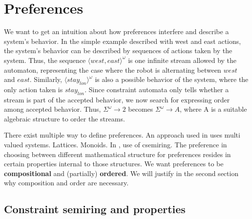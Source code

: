 \section{Preferences}


We want to get an intuition about how preferences interfere and describe a system's behavior. In the simple example described with west and east actions, the system's behavior can be described by sequences of actions taken by the system. Thus, the sequence $\langle west, east \rangle ^{\omega}$ is one infinite stream allowed by the automaton, representing the case where the robot is alternating between $west$ and $east$. Similarly, $\langle stay_{lon} \rangle ^{\omega}$ is also a possible behavior of the system, where the only action taken is $stay_{lon}$. Since constraint automata only tells whether a stream is part of the accepted behavior, we now search for expressing order among accepted behavior. Thus, $\Sigma^{\omega} \rightarrow 2$ becomes $\Sigma^{\omega} \rightarrow A$, where A is a suitable algebraic structure to order the streams.

There exist multiple way to define preferences. An approach used in \cite{bibid} uses multi valued systems. Lattices. Monoids. In \cite{bibid}, use of csemiring. The preference in choosing between different mathematical structure for preferences resides in certain properties internal to those structures. We want preferences to be \textbf{compositional} and (partially) \textbf{ordered}. We will justify in the second section why composition and order are necessary.

\subsection*{Constraint semiring and properties}


